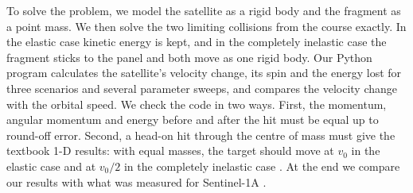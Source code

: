 To solve the problem, we model the satellite as a rigid body and the
fragment as a point mass. We then solve the two limiting collisions from
the course exactly. In the elastic case kinetic energy is kept, and in the
completely inelastic case the fragment sticks to the panel and both move
as one rigid body. Our Python program calculates the satellite's velocity
change, its spin and the energy lost for three scenarios and several
parameter sweeps, and compares the velocity change with the orbital speed.
We check the code in two ways. First, the momentum, angular momentum and
energy before and after the hit must be equal up to round-off error.
Second, a head-on hit through the centre of mass must give the textbook
1-D results: with equal masses, the target should move at $v_0$ in the
elastic case and at $v_0/2$ in the completely inelastic case
\citep{ling2016}. At the end we compare our results with what was
measured for Sentinel-1A \citep{krag2017}.
